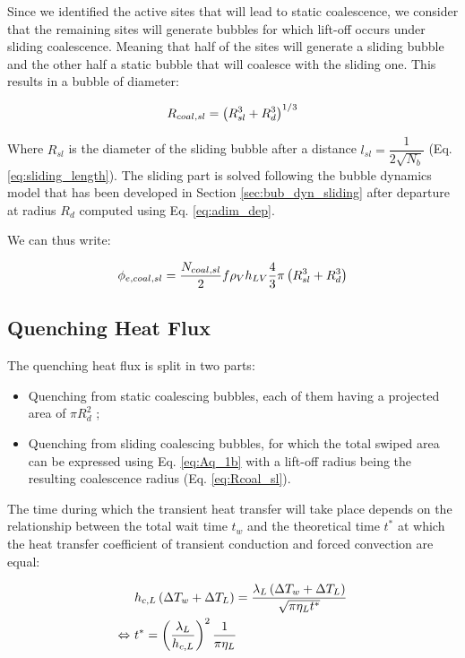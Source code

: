Since we identified the active sites that will lead to static coalescence, we consider that the remaining sites will generate bubbles for which lift-off occurs under sliding coalescence. Meaning that half of the sites will generate a sliding bubble and the other half a static bubble that will coalesce with the sliding one. This results in a bubble of diameter:

\begin{equation}
R_{coal,sl} = \left( R_{sl}^{3}+R_{d}^{3} \right)^{1/3}
\label{eq:Rcoal_sl}
\end{equation}

Where $R_{sl}$ is the diameter of the sliding bubble after a distance $l_{sl} = \dfrac{1}{2\sqrt{N_{b}}}$ (Eq. \ref{eq:sliding_length}). The sliding part is solved following the bubble dynamics model that has been developed in Section \ref{sec:bub_dyn_sliding} after departure at radius $R_{d}$ computed using Eq. \ref{eq:adim_dep}.

\npar

We can thus write:

\begin{equation}
\phi_{e,coal,sl} = \frac{N_{coal,sl}}{2}f \rho_{V} h_{LV} \frac{4}{3} \pi \left( R_{sl}^{3} + R_{d}^{3} \right)
\end{equation}

\subsection{Quenching Heat Flux}

The quenching heat flux is split in two parts:

\begin{itemize}
\item Quenching from static coalescing bubbles, each of them having a projected area of $\pi R_{d}^{2}$ ;
\item Quenching from sliding coalescing bubbles, for which the total swiped area can be expressed using Eq. \ref{eq:Aq_1b} with a lift-off radius being the resulting coalescence radius (Eq. \ref{eq:Rcoal_sl}).
\end{itemize}


The time during which the transient heat transfer will take place depends on the relationship between the total wait time $t_{w}$ and the theoretical time $t^{*}$ at which the heat transfer coefficient of transient conduction and forced convection are equal:

\begin{align}
&h_{c,L}\left( \Delta T_{w} + \Delta T_{L} \right) = \frac{\lambda_{L}\left( \Delta T_{w} + \Delta T_{L} \right)}{\sqrt{\pi\eta_{L}t^{*}}}\\
\Leftrightarrow\  &t^{*} = \left( \frac{\lambda_{L}}{h_{c,L}} \right)^{2}\frac{1}{\pi \eta_{L}}
\end{align}

